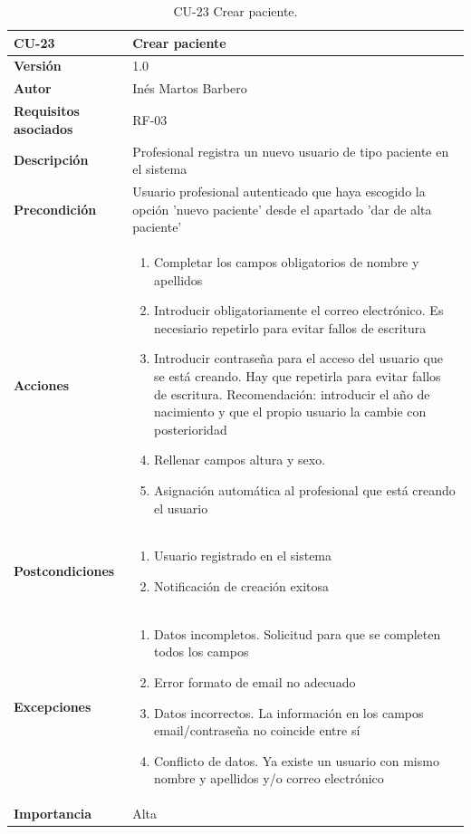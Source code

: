 \begin{table}[p]
	\centering
	\begin{tabularx}{\linewidth}{ p{} p{} }
		\toprule
		\textbf{CU-23}    & \textbf{Crear paciente}\\
		\toprule
		\textbf{Versión}              & 1.0    \\
		\textbf{Autor}                & Inés Martos Barbero \\
		\textbf{Requisitos asociados} & RF-03 \\
		\textbf{Descripción}          & Profesional registra un nuevo usuario de tipo paciente en el sistema \\
		\textbf{Precondición}         & Usuario profesional autenticado que haya escogido la opción 'nuevo paciente' desde el apartado 'dar de alta paciente' \\
		\textbf{Acciones}             &
		\begin{enumerate}
			\def\labelenumi{\arabic{enumi}.}
			\tightlist
			\item Completar los campos obligatorios de nombre y apellidos
            \item Introducir obligatoriamente el correo electrónico. Es necesiario repetirlo para evitar fallos de escritura
            \item Introducir contraseña para el acceso del usuario que se está creando. Hay que repetirla para evitar fallos de escritura. Recomendación: introducir el año de nacimiento y que el propio usuario la cambie con posterioridad
			\item Rellenar campos altura y sexo.
            \item Asignación automática al profesional que está creando el usuario
		\end{enumerate}\\
		\textbf{Postcondiciones}        & 
        \begin{enumerate}
			\def\labelenumi{\arabic{enumi}.}
			\tightlist
			\item Usuario registrado en el sistema
            \item Notificación de creación exitosa
		\end{enumerate}\\
		\textbf{Excepciones}          & 
        \begin{enumerate}
			\def\labelenumi{\arabic{enumi}.}
			\tightlist
			\item Datos incompletos. Solicitud para que se completen todos los campos
            \item Error formato de email no adecuado
            \item Datos incorrectos. La información en los campos email/contraseña no coincide entre sí
            \item Conflicto de datos. Ya existe un usuario con mismo nombre y apellidos y/o correo electrónico
		\end{enumerate}\\
		\textbf{Importancia}          & Alta\\
		\bottomrule
	\end{tabularx}
	\caption{CU-23 Crear paciente.}
\end{table}
